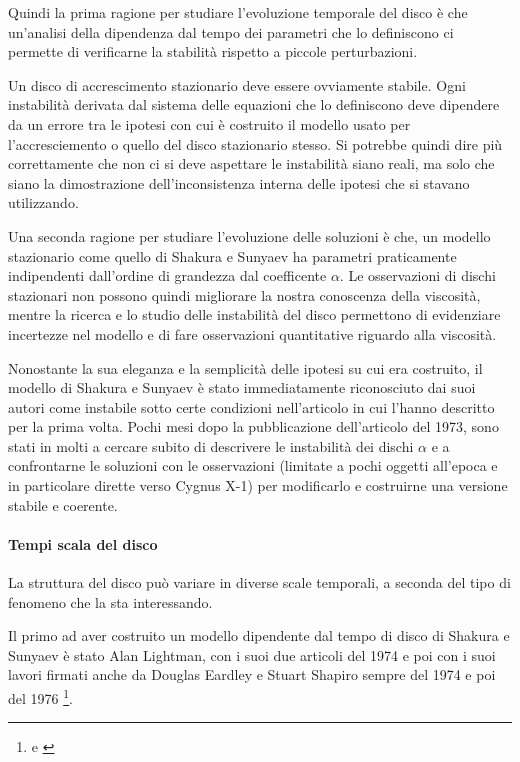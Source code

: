 \documentclass[a4paperbi]{article}
\begin{document}
	Quindi la prima ragione per studiare l'evoluzione temporale del disco è che un'analisi della dipendenza dal tempo dei parametri che lo definiscono ci permette di verificarne la stabilità rispetto a piccole perturbazioni. 
	
	Un disco di accrescimento stazionario deve essere ovviamente stabile. Ogni instabilità derivata dal sistema delle equazioni che lo definiscono deve dipendere da un errore tra le ipotesi con cui è costruito il modello usato per l'accresciemento o quello del disco stazionario stesso. Si potrebbe quindi dire più correttamente che non ci si deve aspettare le instabilità siano reali, ma solo che siano la dimostrazione dell'inconsistenza interna delle ipotesi che si stavano utilizzando.
	
	Una seconda ragione per studiare l'evoluzione delle soluzioni è che, un modello stazionario come quello di Shakura e Sunyaev ha parametri praticamente indipendenti dall'ordine di grandezza dal coefficente $\alpha$. Le osservazioni di dischi stazionari non possono quindi migliorare la nostra conoscenza della viscosità, mentre la ricerca e lo studio delle instabilità del disco permettono di evidenziare incertezze nel modello e di fare osservazioni quantitative riguardo alla viscosità.
	
	Nonostante la sua eleganza e la semplicità delle ipotesi su cui era costruito, il modello di Shakura e Sunyaev è stato immediatamente riconosciuto dai suoi autori come instabile sotto certe condizioni nell'articolo in cui l'hanno descritto per la prima volta. Pochi mesi dopo la pubblicazione dell'articolo del 1973, sono stati in molti a cercare subito di descrivere le instabilità dei dischi $\alpha$ e a confrontarne le soluzioni con le osservazioni (limitate a pochi oggetti all'epoca e in particolare dirette verso Cygnus X-1) per modificarlo e costruirne una versione stabile e coerente.
	
	\paragraph{Tempi scala del disco}	

	La struttura del disco può variare in diverse scale temporali, a seconda del tipo di fenomeno che la sta interessando. 	
	
	Il primo ad aver costruito un modello dipendente dal tempo di disco di Shakura e Sunyaev è stato Alan Lightman, con i suoi due articoli del 1974 e poi con i suoi lavori firmati anche da Douglas Eardley e Stuart Shapiro sempre del 1974 e poi del 1976 \footnote{\cite{LightmanEardley1974} e \cite{ShapiroLightmanEardley1976}}. 
	
\end{document}

